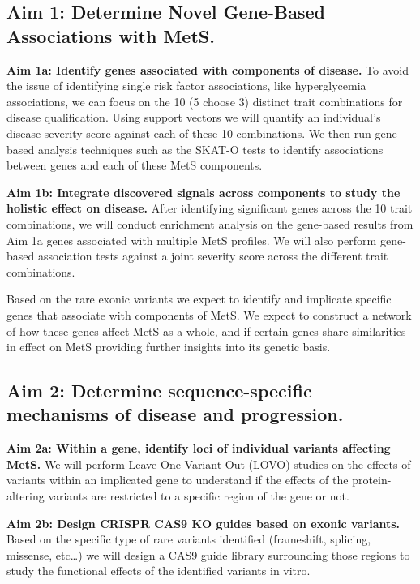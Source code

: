 \documentclass[11pt]{article}
\begin{document}
\subsection*{Aim 1: Determine Novel Gene-Based Associations with MetS.}

\textbf{Aim 1a: Identify genes associated with components of disease.} To avoid the issue of identifying single risk factor associations, like hyperglycemia associations, we can focus on the 10 (5 choose 3) distinct trait combinations for disease qualification. Using support vectors we will quantify an individual's disease severity score against each of these 10 combinations. We then run gene-based analysis techniques such as the SKAT-O tests to identify associations between genes and each of these MetS components.

\textbf{Aim 1b: Integrate discovered signals across components to study the holistic effect on disease.} After identifying significant genes across the 10 trait combinations, we will conduct enrichment analysis on the gene-based results from Aim 1a genes associated with multiple MetS profiles. We will also perform gene-based association tests against a joint severity score across the different trait combinations.

Based on the rare exonic variants we expect to identify and implicate specific genes that associate with components of MetS. We expect to construct a network of how these genes affect MetS as a whole, and if certain genes share similarities in effect on MetS providing further insights into its genetic basis.

\subsection*{Aim 2: Determine sequence-specific mechanisms of disease and progression.}

\textbf{Aim 2a: Within a gene, identify loci of individual variants affecting MetS.} We will perform Leave One Variant Out (LOVO) studies on the effects of variants within an implicated gene to understand if the effects of the protein-altering variants are restricted to a specific region of the gene or not.

\textbf{Aim 2b: Design CRISPR CAS9 KO guides based on exonic variants.} Based on the specific type of rare variants identified (frameshift, splicing, missense, etc…) we will design a CAS9 guide library surrounding those regions to study the functional effects of the identified variants in vitro.
\end{document}
